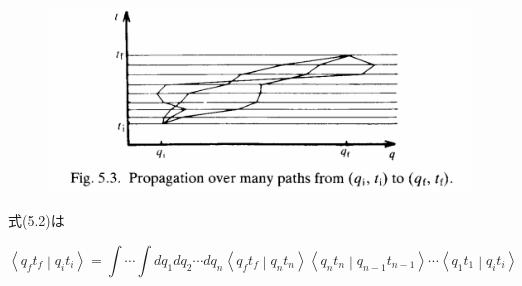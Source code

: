 \documentclass[a4paper,12pt]{article}
\newcommand{\braket}[2]{\left\langle #1\middle|#2\right\rangle}
\begin{document}
\begin{figure}[H]
    \centering
    \includegraphics[width=\textwidth]{figure/fig5-3.png}
\end{figure}

式(5.2)は

\begin{equation*}
    \braket{q_{f}t_{f}}{q_{i}t_{i}} = \int \cdots \int dq_{1}dq_{2} \cdots dq_{n} \braket{q_{f}t_{f}}{q_{n}t_{n}}\braket{q_{n}t_{n}}{q_{n-1}t_{n-1}} \cdots \braket{q_{1}t_{1}}{q_{i}t_{i}} \tag{5.6}
\end{equation*}
\end{document}
